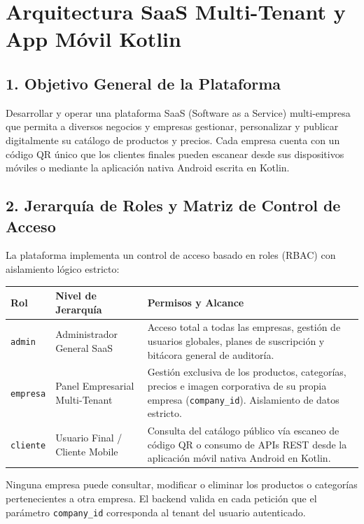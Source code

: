 \section{Arquitectura SaaS Multi-Tenant y App Móvil Kotlin}

\subsection{1. Objetivo General de la Plataforma}
Desarrollar y operar una plataforma SaaS (Software as a Service) multi-empresa que permita a diversos negocios y empresas gestionar, personalizar y publicar digitalmente su catálogo de productos y precios. Cada empresa cuenta con un código QR único que los clientes finales pueden escanear desde sus dispositivos móviles o mediante la aplicación nativa Android escrita en Kotlin.

\subsection{2. Jerarquía de Roles y Matriz de Control de Acceso}
La plataforma implementa un control de acceso basado en roles (RBAC) con aislamiento lógico estricto:

\begin{center}
\begin{tabular}{lp{5.5cm}p{6cm}}
\toprule
\textbf{Rol} & \textbf{Nivel de Jerarquía} & \textbf{Permisos y Alcance} \\
\midrule
\texttt{admin} & Administrador General SaaS & Acceso total a todas las empresas, gestión de usuarios globales, planes de suscripción y bitácora general de auditoría. \\
\texttt{empresa} & Panel Empresarial Multi-Tenant & Gestión exclusiva de los productos, categorías, precios e imagen corporativa de su propia empresa (\texttt{company\_id}). Aislamiento de datos estricto. \\
\texttt{cliente} & Usuario Final / Cliente Mobile & Consulta del catálogo público vía escaneo de código QR o consumo de APIs REST desde la aplicación móvil nativa Android en Kotlin. \\
\bottomrule
\end{tabular}
\end{center}

\begin{nota}
Ninguna empresa puede consultar, modificar o eliminar los productos o categorías pertenecientes a otra empresa. El backend valida en cada petición que el parámetro \texttt{company\_id} corresponda al tenant del usuario autenticado.
\end{nota}

